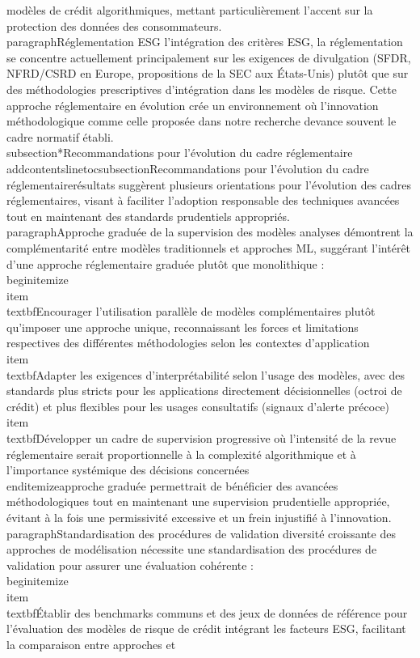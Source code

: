modèles de crédit algorithmiques, mettant particulièrement l'accent sur la protection des données des consommateurs.\n\n\\paragraph{Réglementation ESG} \n\nConcernant l'intégration des critères ESG, la réglementation se concentre actuellement principalement sur les exigences de divulgation (SFDR, NFRD/CSRD en Europe, propositions de la SEC aux États-Unis) plutôt que sur des méthodologies prescriptives d'intégration dans les modèles de risque. Cette approche réglementaire en évolution crée un environnement où l'innovation méthodologique comme celle proposée dans notre recherche devance souvent le cadre normatif établi.\n\n\\subsection*{Recommandations pour l'évolution du cadre réglementaire}\n\\addcontentsline{toc}{subsection}{Recommandations pour l'évolution du cadre réglementaire}\n\nNos résultats suggèrent plusieurs orientations pour l'évolution des cadres réglementaires, visant à faciliter l'adoption responsable des techniques avancées tout en maintenant des standards prudentiels appropriés.\n\n\\paragraph{Approche graduée de la supervision des modèles} \n\nNos analyses démontrent la complémentarité entre modèles traditionnels et approches ML, suggérant l'intérêt d'une approche réglementaire graduée plutôt que monolithique :\n\n\\begin{itemize}\n    \\item \\textbf{Encourager l'utilisation parallèle de modèles complémentaires} plutôt qu'imposer une approche unique, reconnaissant les forces et limitations respectives des différentes méthodologies selon les contextes d'application\n    \n    \\item \\textbf{Adapter les exigences d'interprétabilité selon l'usage} des modèles, avec des standards plus stricts pour les applications directement décisionnelles (octroi de crédit) et plus flexibles pour les usages consultatifs (signaux d'alerte précoce)\n    \n    \\item \\textbf{Développer un cadre de supervision progressive} où l'intensité de la revue réglementaire serait proportionnelle à la complexité algorithmique et à l'importance systémique des décisions concernées\n\\end{itemize}\n\nCette approche graduée permettrait de bénéficier des avancées méthodologiques tout en maintenant une supervision prudentielle appropriée, évitant à la fois une permissivité excessive et un frein injustifié à l'innovation.\n\n\\paragraph{Standardisation des procédures de validation} \n\nLa diversité croissante des approches de modélisation nécessite une standardisation des procédures de validation pour assurer une évaluation cohérente :\n\n\\begin{itemize}\n    \\item \\textbf{Établir des benchmarks communs et des jeux de données de référence} pour l'évaluation des modèles de risque de crédit intégrant les facteurs ESG, facilitant la comparaison entre approches et 